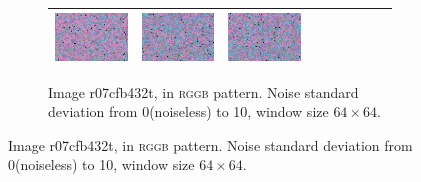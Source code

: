 \documentclass{ipol}
\begin{document}
\begin{figure}[ht]
\begin{subfigure}[t]{\linewidth}
\begin{tabular}{ccccccccc}
                \includegraphics[width=\s]{images/flowers/LINEAR/bid_n10_64_grids.png}&
                \includegraphics[width=\s]{images/flowers/PPG/bid_n10_64_grids.png}&
                \includegraphics[width=\s]{images/flowers/VNG/bid_n10_64_grids.png}\\
                \bottomrule
        \end{tabular}
        \caption{Image r07cfb432t, in \textsc{rggb} pattern. Noise standard deviation from 0(noiseless) to 10, window size $64\times64$.}
        \label{fig:noise:1}
\end{subfigure}
\end{figure}
\end{document}
